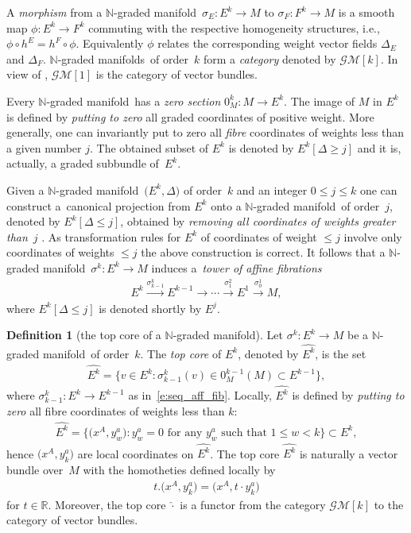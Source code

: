 \documentclass[10pt,a4paper]{amsart}
\newcommand{\grB}{{$\N$-graded manifold}}
\newcommand{\grBs}{{$\N$-graded manifolds}}
\newcommand{\degree}{{order}}
\newcommand{\R}{\mathbb{R}}
\newcommand{\N}{\mathbb{N}}
\newcommand{\ra}{\rightarrow}
\newcommand{\core}[1]{\widehat{#1}} %
\newcommand{\catGB}{\mathcal{GM}}
\numberwithin{equation}{section}
\theoremstyle{definition}
\newtheorem{df}[thm]{Definition}
\begin{document}
 A \emph{morphism} from a \grB\ $\sigma_E\colon E^k\ra M$ to $\sigma_F\colon F^k \ra M$ is a smooth map $\phi\colon E^k\ra F^k$ commuting with the respective homogeneity structures, i.e., $\phi \circ h^E = h^F\circ \phi$. Equivalently $\phi$ relates the corresponding weight vector fields $\Delta_E$ and $\Delta_F$. \grBs\ of \degree\ $k$ form a \emph{category} denoted by $\catGB[k]$. In view of \cite[Theorem 2.4]{JG_MR_hi_VB_2009}, $\catGB[1]$ is the category of vector bundles.

Every \grB\ has a \emph{zero section} $0_M^k\colon M\ra E^k$. The image of $M$ in $E^k$ is defined by \emph{putting to zero} \cite[Example 1.10]{BGR} all graded coordinates of positive weight. More generally, one can invariantly put to zero all \emph{fibre} coordinates of weights less than a given number $j$. The obtained subset of $E^k$ is denoted by $E^k[\Delta \geq j]$ and it is, actually, a graded subbundle of~$E^k$.

Given a \grB\ $\big(E^k, \Delta\big)$ of \degree\ $k$ and an integer $0\leq j\leq k$ one can
construct a~canonical projection from $E^k$ onto a \grB\ of \degree\ $j$, denoted by \mbox{$E^k[\Delta\leq j]$}, obtained by \emph{removing all coordinates of weights greater than}~$j$ \cite[Definition~1.6]{BGR}. As transformation rules for $E^k$ of coordinates of weight $\leq j$ involve only coordinates of weights $\leq j$ the above construction is correct. It follows that
a \grB\ $\sigma^k\colon E^k\to M$ induces a~\emph{tower of affine fibrations}~\cite{Voronov_2002}
\begin{gather}\label{e:seq_aff_fib}
E^k\xrightarrow{\sigma^k_{k-1}} E^{k-1}\to\cdots \xrightarrow{\sigma^2_1} E^1\xrightarrow{\sigma^1_0} M,
\end{gather}
where $E^k[\Delta\leq j]$ is denoted shortly by $E^j$.

\begin{df}[the top core of a \grB]
Let $\sigma^k\colon E^k\ra M$ be a \grB\ of \degree\ $k$. The \emph{top core} of $E^k$, denoted by $\core{E^k}$, is the set
\begin{gather*}
\core{E^k} = \big\{ v\in E^k\colon \sigma^k_{k-1} (v) \in 0_M^{k-1}(M) \subset E^{k-1} \big\},
\end{gather*}
where $\sigma^k_{k-1}\colon E^k\ra E^{k-1}$ as in~\eqref{e:seq_aff_fib}. Locally, $\core{E^k}$ is defined by \emph{putting to zero} all fibre coordinates of weights less than $k$:
\begin{gather*}
 \core{E^k} = \big\{\big(x^A, y^a_w\big)\colon y^a_w=0 \text{ for any } y^a_w \text{ such that } 1\leq w < k\big\} \subset E^k,
 \end{gather*}
hence $\big(x^A, y^a_k\big)$ are local coordinates on $\core{E^k}$. The top core $\core{E^k}$ is naturally a vector bundle over~$M$ with the homotheties defined locally by
\begin{gather*} t.\big(x^A, y^a_k\big) = \big(x^A, t\cdot y^a_k\big)
\end{gather*}
for $t\in\R$. Moreover, the top core $\core{\cdot}$ is a functor from the category $\catGB[k]$ to the category of vector bundles.
\end{df}
\end{document}
